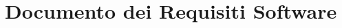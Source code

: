 \chapter{Documento dei Requisiti Software}
\label{cha:Documento dei Requisiti Software}

\lipsum[1-4]